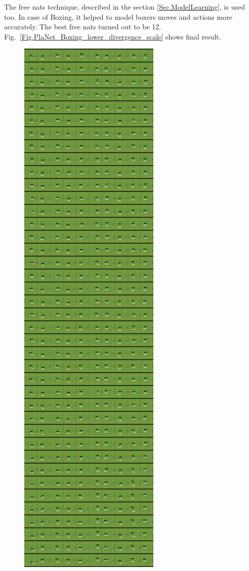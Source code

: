 The free nats technique, described in the section \ref{Sec.ModelLearning}, is used too. In case of Boxing, it helped to model boxers moves and actions more accurately. The best free nats turned out to be 12. Fig.~\ref{Fig.PlaNet_Boxing_lower_divergence_scale} shows final result.

\begin{figure}[H]
\includegraphics[height=0.9\textheight,keepaspectratio]{figures/PlaNet/Boxing_memory_sharp.png}

\end{figure}
